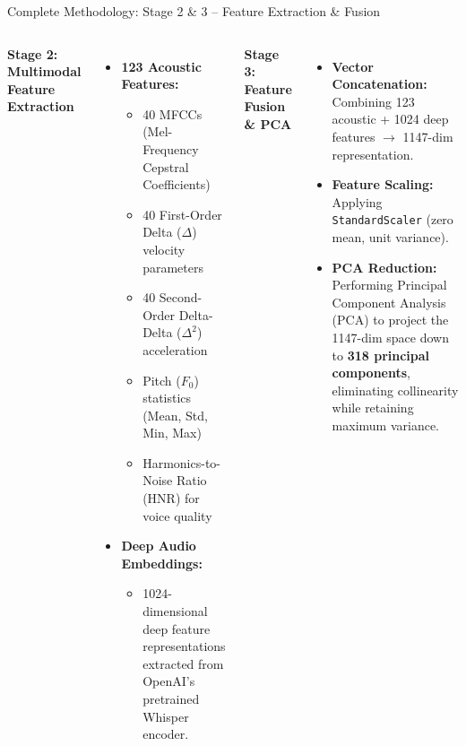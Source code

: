 \documentclass[aspectratio=169]{beamer}
\begin{document}
\begin{frame}{Complete Methodology: Stage 2 \& 3 -- Feature Extraction \& Fusion}
    \begin{columns}[T]
        \textbf{Stage 2: Multimodal Feature Extraction}
        \begin{itemize}
            \item \textbf{123 Acoustic Features:}
                \begin{itemize}
                    \item 40 MFCCs (Mel-Frequency Cepstral Coefficients)
                    \item 40 First-Order Delta ($\Delta$) velocity parameters
                    \item 40 Second-Order Delta-Delta ($\Delta^2$) acceleration
                    \item Pitch ($F_0$) statistics (Mean, Std, Min, Max)
                    \item Harmonics-to-Noise Ratio (HNR) for voice quality
                \end{itemize}
            \item \textbf{Deep Audio Embeddings:}
                \begin{itemize}
                    \item 1024-dimensional deep feature representations extracted from OpenAI's pretrained Whisper encoder.
                \end{itemize}
        \end{itemize}

        \textbf{Stage 3: Feature Fusion & PCA}
        \begin{itemize}
            \item \textbf{Vector Concatenation:} Combining 123 acoustic + 1024 deep features $\rightarrow$ 1147-dim representation.
            \item \textbf{Feature Scaling:} Applying \texttt{StandardScaler} (zero mean, unit variance).
            \item \textbf{PCA Reduction:} Performing Principal Component Analysis (PCA) to project the 1147-dim space down to \textbf{318 principal components}, eliminating collinearity while retaining maximum variance.
        \end{itemize}
    \end{columns}
\end{frame}
\end{document}
